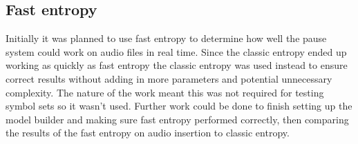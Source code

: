 \subsection{Fast entropy}
Initially it was planned to use fast entropy to determine how well the pause system could work on audio files in real time. Since the classic entropy ended up working as quickly as fast entropy the classic entropy was used instead to ensure correct results without adding in more parameters and potential unnecessary complexity. The nature of the work meant this was not required for testing symbol sets so it wasn't used. Further work could be done to finish setting up the model builder and making sure fast entropy performed correctly, then comparing the results of the fast entropy on audio insertion to classic entropy.
%
%
%
%
%

%
%

